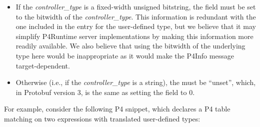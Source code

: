 \documentclass[11pt]{article}
\begin{document}
{%
\begin{itemize}%

\item{}
If the \emph{controller\_type} is a fixed-width unsigned bitstring, the 
field must be set to the bitwidth of the \emph{controller\_type}. This information
is redundant with the one included in the  entry for the
user-defined type, but we believe that it may simplify P4Runtime server
implementations by making this information more readily available. We also
believe that using the bitwidth of the underlying type here would be
inappropriate as it would make the P4Info message target-dependent.%

\item{}
Otherwise (i.e., if the \emph{controller\_type} is a string), the  must
be \textquotedblleft{}unset\textquotedblright{}, which, in Protobuf version 3, is the same as setting the field to
0.%
\end{itemize}%

\noindent{}For example, consider the following P4 snippet, which declares a P4 table
matching on two expressions with translated user-defined types:%

}
\end{document}
